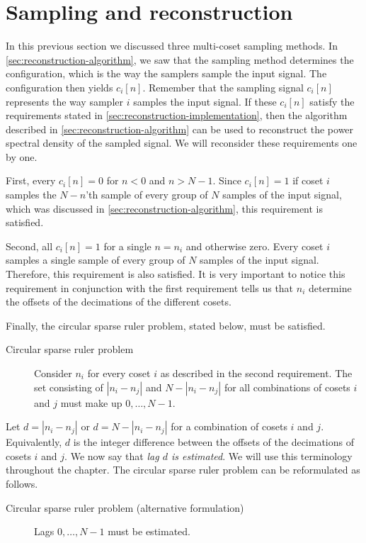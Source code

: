 \documentclass[a4paper, openany, oneside]{memoir}
\begin{document}
\section{Sampling and reconstruction}
In this previous section we discussed three multi-coset sampling methods. In \cref{sec:reconstruction-algorithm}, we saw that the sampling method determines the configuration, which is the way the samplers sample the input signal. The configuration then yields $c_i[n]$. Remember that the sampling signal $c_i[n]$ represents the way sampler $i$ samples the input signal. If these $c_i[n]$ satisfy the requirements stated in \cref{sec:reconstruction-implementation}, then the algorithm described in \cref{sec:reconstruction-algorithm} can be used to reconstruct the power spectral density of the sampled signal. We will reconsider these requirements one by one.

First, every $c_i[n]=0$ for $n < 0$ and $n > N-1$. Since $c_i[n]=1$ if coset $i$ samples the $N-n$'th sample of every group of $N$ samples of the input signal, which was discussed in \cref{sec:reconstruction-algorithm}, this requirement is satisfied.

Second, all $c_i[n]=1$ for a single $n=n_i$ and otherwise zero. Every coset $i$ samples a single sample of every group of $N$ samples of the input signal. Therefore, this requirement is also satisfied. It is very important to notice this requirement in conjunction with the first requirement tells us that $n_i$ determine the offsets of the decimations of the different cosets.

Finally, the circular sparse ruler problem, stated below, must be satisfied.

\begin{description}
    \item[Circular sparse ruler problem] Consider $n_i$ for every coset $i$ as described in the second requirement. The set consisting of $|n_i - n_j|$ and $N-|n_i-n_j|$ for all combinations of cosets $i$ and $j$ must make up $0,\ldots,N-1$.
\end{description}

Let $d=|n_i - n_j|$ or $d=N-|n_i-n_j|$ for a combination of cosets $i$ and $j$. Equivalently, $d$ is the integer difference between the offsets of the decimations of cosets $i$ and $j$. We now say that \textit{lag $d$ is estimated}. We will use this terminology throughout the chapter. The circular sparse ruler problem can be reformulated as follows.

\begin{description}
    \item[Circular sparse ruler problem (alternative formulation)] Lags $0,\ldots,N-1$ must be estimated.
\end{description}
\end{document}
